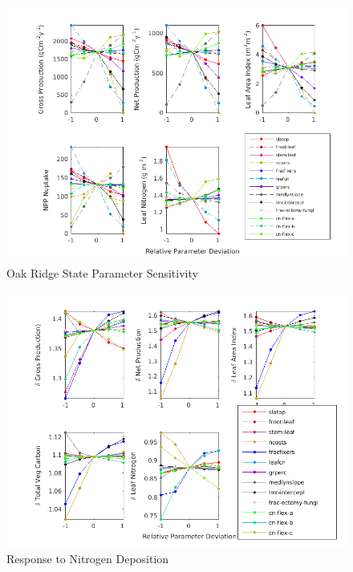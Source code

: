 \documentclass[draft,linenumbers]{agujournal}
\begin{document}
 \begin{figure}[h]
     \centering
     \includegraphics[width=35pc]{matlab/figures/frac_deviation_p1CLM5_ORN__y1.png}
     \caption{Oak Ridge State Parameter Sensitivity}
     \label{ORN state}
  \end{figure}
  
 \begin{figure}[h]
     \centering
     \includegraphics[width=35pc]{matlab/figures/frac_deviation_CO2_response_1CLM5_1x1pt_Br-cax_ens_transient_ELEV_PI_y1.png}
     \caption{Response to Nitrogen Deposition}
     \label{Caxiuana CO2 response Parameter Sensitivity }
  \end{figure}
  
\end{document}
